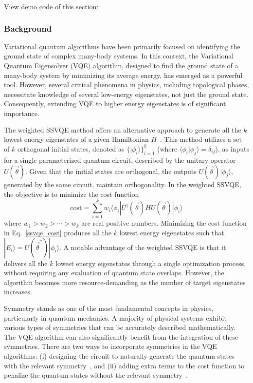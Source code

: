 View demo code of this section: 

\subsubsection{Background}
Variational quantum algorithms have been primarily focused on identifying the ground state of complex many-body systems. In this context, the Variational Quantum Eigensolver (VQE) algorithm, designed to find the ground state of a many-body system  by minimizing its average energy, has emerged as a powerful tool. However, several critical phenomena in physics, including topological phases, necessitate knowledge of several low-energy eigenstates, not just the ground state. Consequently, extending VQE to higher energy eigenstates is of significant importance.

The weighted SSVQE method offers an alternative approach to generate all the $k$ lowest energy eigenstates of a given Hamiltonian $H$~\cite{nakanishi2019subspace}. This method utilizes a set of $k$ orthogonal initial states, denoted as $\{|\phi_{i}\rangle\}_{i=1}^{k}$ (where $\langle \phi_{i} | \phi_{j} \rangle = \delta_{ij}$), as inputs for a single parameterized quantum circuit, described by the unitary operator $U(\vec{\theta})$. Given that the initial states are orthogonal, the outputs $U(\vec{\theta})| \phi_{j} \rangle$, generated by the same circuit, maintain orthogonality. In the weighted SSVQE, the objective is to minimize the cost function
\begin{equation}
    \mathrm{cost} = \sum_{i=1}^{k} w_{i} \langle \phi_{i}| U^{\dagger}(\vec{\theta}) H U(\vec{\theta}) | \phi_{i} \rangle
    \label{ssvqe_cost}
\end{equation}
where $w_1 > w_2 > \cdots > w_k$ are real positive numbers. Minimizing the cost function in Eq.~\eqref{ssvqe_cost} produces all the $k$ lowest energy eigenstates such that $|E_{i}\rangle = U(\vec{\theta}^{*})|\phi_{i}\rangle$.
A notable advantage of the weighted SSVQE is that it delivers all the $k$ lowest energy eigenstates through a single optimization process, without requiring any evaluation of quantum state overlaps. However, the algorithm becomes more resource-demanding as the number of target eigenstates increases.

Symmetry stands as one of the most fundamental concepts in physics, particularly in quantum mechanics. A majority of physical systems exhibit various types of symmetries that can be accurately described mathematically. The VQE algorithm can also significantly benefit from the integration of these symmetries. There are two ways to incorporate symmetries in the VQE algorithms: (i) designing the circuit to naturally generate the quantum states with the relevant symmetry~\cite{Lyu2020accelerated,Gard2020,barron2021preserving}, and (ii) adding extra terms to the cost function to penalize the quantum states without the relevant symmetry~\cite{mcclean2016theory,ryabinkin2018constrained}.

